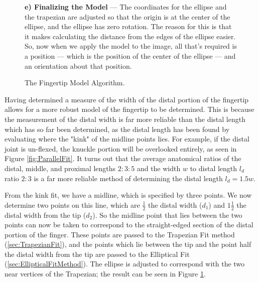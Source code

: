 \begin{figure}[p!]
    \begin{minipage}{0.95\textwidth}
         \textbf{e) Finalizing the Model} --- The coordinates for the ellipse and the trapezian are adjusted so that the origin is at the center of the ellipse, and the ellipse has zero rotation. The reason for this is that it makes calculating the distance from the edges of the ellipse easier. So, now when we apply the model to the image, all that's required is a position --- which is the position of the center of the ellipse --- and an orientation about that position. 
    \end{minipage}
    \caption{The Fingertip Model Algorithm.}\label{fig:ModelingFingertip}
\end{figure}

Having determined a measure of the width of the distal portion of the fingertip allows for a more robust model of the fingertip to be determined. This is because the measurement of the distal width is far more reliable than the distal length which has so far been determined, as the distal length has been found by evaluating where the "kink" of the midline points lies. For example, if the distal joint is un-flexed, the knuckle portion will be overlooked entirely, as seen in Figure \ref{fig:ParallelFit}. It turns out that the average anatomical ratios of the distal,  middle, and  proximal lengths $2:3:5$ and the width $w$ to distal length $l_{d}$ ratio $2 : 3$  is a far more reliable method of determining the distal length $l_{d} = 1.5 w$.

From the kink fit, we have a midline, which is specified by three points. We now determine two points on this line, which are $\frac{1}{2}$ the distal width ($d_1$) and $1\frac{1}{2}$ the distal width from the tip ($d_2$). So the midline point that lies between the two points can now be taken to correspond to the straight-edged section of the distal portion of the finger. These points are passed to the Trapezian Fit method (\ref{sec:TrapezianFit}), and the points which lie between the tip and the point half the distal width from the tip are passed to the Elliptical Fit (\ref{sec:EllipticalFitMethod}). The ellipse is adjusted to correspond with the two near vertices of the Trapezian; the result can be seen in Figure \ref{fig:ModelingFingertip}.

